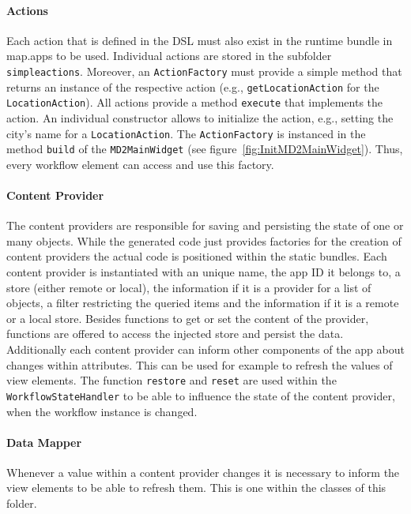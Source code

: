 \paragraph{Actions}
Each action that is defined in the \MD DSL must also exist in the \MD runtime bundle in map.apps to be used. Individual actions are stored in the subfolder \lstinline!simpleactions!. Moreover, an \lstinline!ActionFactory! must provide a simple method that returns an instance of the respective action (e.g., \lstinline!getLocationAction! for the \lstinline!LocationAction!). All actions provide a method \lstinline!execute! that implements the action. An individual constructor allows to initialize the action, e.g., setting the city's name for a \lstinline!LocationAction!. The \lstinline!ActionFactory! is instanced in the method \lstinline!build! of the \lstinline!MD2MainWidget! (see figure~\ref{fig:InitMD2MainWidget}). Thus, every workflow element can access and use this factory.

\paragraph{Content Provider}\label{par:contentProvider}
The content providers are responsible for saving and persisting the state of one or many objects. While the generated code just provides factories for the creation of content providers the actual code is positioned within the static bundles. Each content provider is instantiated with an unique name, the app ID it belongs to, a store (either remote or local), the information if it is a provider for a list of objects, a filter restricting the queried items and the information if it is a remote or a local store.
Besides functions to get or set the content of the provider, functions are offered to access the injected store and persist the data.
Additionally each content provider can inform other components of the app about changes within attributes. This can be used for example to refresh the values of view elements.
The function \lstinline|restore| and \lstinline|reset| are used within the \lstinline|WorkflowStateHandler| to be able to influence the state of the content provider, when the workflow instance is changed.

\paragraph{Data Mapper}
Whenever a value within a content provider changes it is necessary to inform the view elements to be able to refresh them. This is one within the classes of this folder.

